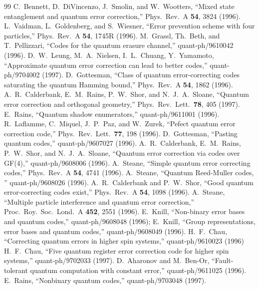 \documentclass{report}
\begin{document}
\begin{thebibliography}{99}
 C.~Bennett, D.~DiVincenzo, J.~Smolin, and W.~Wootters,
``Mixed state entanglement and quantum error correction,'' Phys.\ Rev.\ A
{\bf 54}, 3824 (1996).
 L.~Vaidman, L.~Goldenberg, and S.~Wiesner, ``Error prevention
scheme with four particles,'' Phys.\ Rev.\ A {\bf 54}, 1745R (1996).
 M.~Grassl, Th.~Beth, and T.~Pellizzari, ``Codes for the
quantum erasure channel,'' quant-ph/9610042 (1996).
 D.~W.~Leung, M.~A.~Nielsen, I.~L.~Chuang, Y.~Yamamoto,
``Approximate quantum error correction can lead to better codes,''
quant-ph/9704002 (1997).
 D.~Gottesman, ``Class of quantum error-correcting
codes saturating the quantum Hamming bound,'' Phys.\ Rev.\ A {\bf 54}, 1862
(1996).
 A.~R.~Calderbank, E.~M.~Rains, P.~W.~Shor, and
N.~J.~A.~Sloane, ``Quantum error correction and orthogonal geometry,'' Phys.\
Rev.\ Lett.\ {\bf 78}, 405 (1997).
 E.~Rains, ``Quantum shadow enumerators,''
quant-ph/9611001 (1996).
 R.~Laflamme, C.~Miquel, J.~P.~Paz, and W.~Zurek,
``Pefect quantum error correction code,'' Phys.\ Rev.\ Lett.\ {\bf 77}, 198 
(1996).
 D.~Gottesman, ``Pasting quantum codes,''
quant-ph/9607027 (1996).
 A.~R.~Calderbank, E.~M.~Rains, P.~W.~Shor, and
N.~J.~A.~Sloane, ``Quantum error correction via codes over GF(4),''
quant-ph/9608006 (1996).
 A.~Steane, ``Simple quantum error correcting codes,''
Phys.\ Rev.\ A {\bf 54}, 4741 (1996).
 A.~Steane, ``Quantum Reed-Muller codes, ''
quant-ph/9608026 (1996).
 A.~R.~Calderbank and P.~W.~Shor, ``Good quantum
error-correcting codes exist,'' Phys.\ Rev.\ A {\bf 54}, 1098 (1996).
\bibitem{steane-CSS} A.~Steane, ``Multiple particle interference and quantum
error correction,'' Proc.\ Roy.\ Soc.\ Lond.\ A {\bf 452}, 2551 (1996).
\bibitem{knill-qudit} E.~Knill, ``Non-binary error bases and quantum codes,''
quant-ph/9608048 (1996); E.~Knill, ``Group representations, error bases and
quantum codes,'' quant-ph/9608049 (1996).
 H.~F.~Chau, ``Correcting quantum errors in higher spin 
systems,'' quant-ph/9610023 (1996)
 H.~F.~Chau, ``Five quantum register error correction
code for higher spin systems,'' quant-ph/9702033 (1997).
 D.~Aharonov and M.~Ben-Or, ``Fault-tolerant quantum
computation with constant error,'' quant-ph/9611025 (1996).
 E.~Rains, ``Nonbinary quantum codes,'' 
quant-ph/9703048 (1997).

\end{thebibliography}
\end{document}
